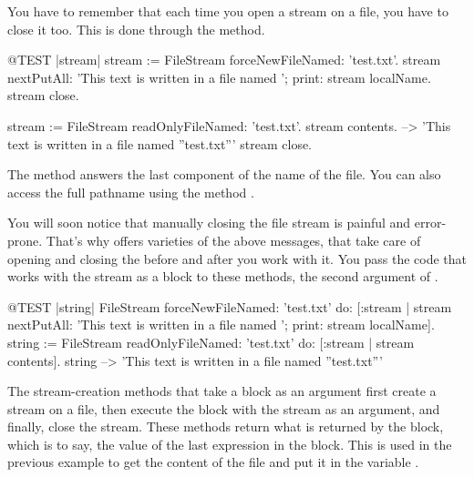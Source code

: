 \documentclass[a4paper,10pt,twoside]{book}
\begin{document}
You have to remember that each time you open a stream on a file, you have to close it too.
This is done through the  method.

\begin{code}{@TEST |stream|}
stream := FileStream forceNewFileNamed: 'test.txt'.
stream
    nextPutAll: 'This text is written in a file named ';
    print: stream localName.
stream close.

stream := FileStream readOnlyFileNamed: 'test.txt'.
stream contents. --> 'This text is written in a file named ''test.txt'''
stream close.
\end{code}



The method  answers the last component of the name of the file.
You can also access the full pathname using the method .

You will soon notice that manually closing the file stream is painful and error-prone.
That's why  offers varieties of the above messages, that take care of opening and closing the  before and after you work with it. 
You pass the code that works with the stream as a block to these methods, \eg the second argument of .

\begin{code}{@TEST |string|}
FileStream
    forceNewFileNamed: 'test.txt'
    do: [:stream |
        stream
            nextPutAll: 'This text is written in a file named ';
            print: stream localName].
string := FileStream
            readOnlyFileNamed: 'test.txt'
            do: [:stream | stream contents].
string --> 'This text is written in a file named ''test.txt'''
\end{code}

The stream-creation methods that take a block as an argument first create a stream on a file, then execute the block with the stream
as an argument, and finally, close the stream.
These methods return what is returned by the block, which is to say, the value of the last expression in the block.
This is used in the previous example to get the content of the file and put it in the variable .
\end{document}
